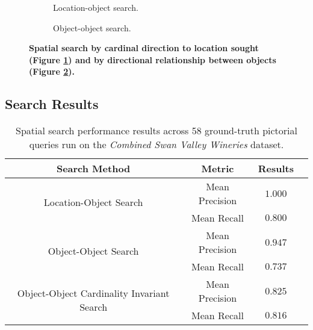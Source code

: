 \begin{figure}[h]
    \centering
    \begin{subfigure}[t]{.2\textwidth}
        
        \caption{\small Location-object search.} 
        \label{fig:spatial_search_loc}
    \end{subfigure}
    \hfill
    \begin{subfigure}[t]{.2\textwidth}
        
        \caption{\small Object-object search.} 
        \label{fig:spatial_search_obj}
    \end{subfigure}
    \hfill
    \caption{\textbf{Spatial search by cardinal direction to location sought (Figure \ref{fig:spatial_search_loc}) and by directional relationship between objects (Figure \ref{fig:spatial_search_obj}).}}\label{figure:spatial_search} 
\end{figure}
\normalsize


\subsection{Search Results}

\small{
\begin{table}[h!]
    \begin{center}
        \begin{tabular}{ |c|c|c|c| } 
            \hline
            Search Method & Metric & Results \\
            \hline
            \multirow{2}{18em}{Location-Object Search} & Mean Precision & $1.000$ \\
            & Mean Recall & $0.800$\\%
            \hline     
            \multirow{2}{18em}{Object-Object Search} & Mean Precision & $0.947$ \\ 
            &Mean Recall & $0.737$ \\
            \hline
            \multirow{2}{18em}{Object-Object Cardinality Invariant Search} & Mean Precision & $0.825$ \\ 
            &Mean Recall & $0.816$ \\
            \hline
        \end{tabular}
        \caption{Spatial search performance results across 58 ground-truth pictorial queries run on the \textit{Combined Swan Valley Wineries} dataset.}         \label{Table:GroundTruth}
    \end{center}
    \vspace{-20pt}
\end{table}
}
\normalsize

